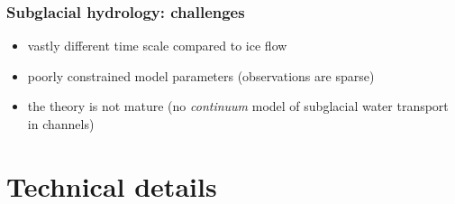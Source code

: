 \documentclass[hide notes,intlimits]{beamer}
\begin{document}
\begin{frame}
  \frametitle{Subglacial hydrology: challenges}

  \begin{itemize}
  \item vastly different time scale compared to ice flow
  \item poorly constrained model parameters (observations are sparse)
  \item the theory is not mature (no \emph{continuum} model of
    subglacial water transport in channels)
  \end{itemize}
\end{frame}



\section{Technical details}
\end{document}
